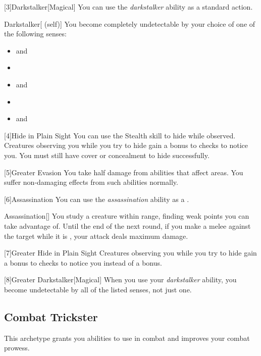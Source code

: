         [3]{Darkstalker}[Magical] You can use the \textit{darkstalker} ability as a standard action.
        \begin{attuneability}{Darkstalker}[ (self)]
            You become completely undetectable by your choice of one of the following senses:
            \begin{itemize}
                \item {} and 
                \item {}
                \item {} and 
                \item {}
                \item {} and 
            \end{itemize}
        \end{attuneability}

        [4]{Hide in Plain Sight} You can use the Stealth skill to hide while observed.
        Creatures observing you while you try to hide gain a  bonus to checks to notice you.
        You must still have cover or concealment to hide successfully.

        [5]{Greater Evasion} You take half damage from abilities that affect areas.
        You suffer non-damaging effects from such abilities normally.

        [6]{Assassination} You can use the \textit{assassination} ability as a .
        \begin{freeability}{Assassination}[]
            You study a creature within \rngmed range, finding weak points you can take advantage of.
            Until the end of the next round, if you make a melee  against the target while it is \unaware, your attack deals maximum damage.
        \end{freeability}

        [7]{Greater Hide in Plain Sight} Creatures observing you while you try to hide gain a  bonus to checks to notice you instead of a  bonus.

        [8]{Greater Darkstalker}[Magical] When you use your \textit{darkstalker} ability, you become undetectable by all of the listed senses, not just one.

    \subsection{Combat Trickster}
        This archetype grants you abilities to use in combat and improves your combat prowess.

